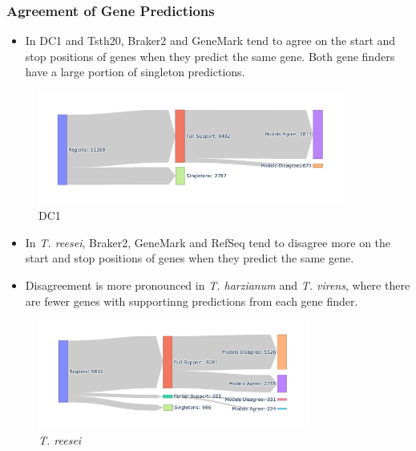 \documentclass[t]{beamer}
\begin{document}
\begin{frame}
	\frametitle{Agreement of Gene Predictions}
	\centering
	\begin{itemize}
		\item In DC1 and Tsth20, Braker2 and GeneMark tend to agree on the start and stop positions of genes when they predict the same gene. Both gene finders have a large portion of singleton predictions.
	\end{itemize}
	\begin{figure}
		\includegraphics[width=0.9\textwidth]{../../working-thesis/figures/dc1-region-breakdown.png}
		\caption{DC1}
	\end{figure}
\end{frame}

\begin{frame}
	\vspace{1cm}
	\centering
	\begin{itemize}
		\item In \textit{T. reesei}, Braker2, GeneMark and RefSeq tend to disagree more on the start and stop positions of genes when they predict the same gene.
		\item Disagreement is more pronounced in \textit{T. harzianum} and \textit{T. virens}, where there are fewer genes with supportinng predictions from each gene finder.
		
	\end{itemize}
	\begin{figure}
		\includegraphics[width=0.8\textwidth]{../../working-thesis/figures/t-reesei-region-breakdown.png}
		\caption{\textit{T. reesei}}
	\end{figure}
\end{frame}
\end{document}
